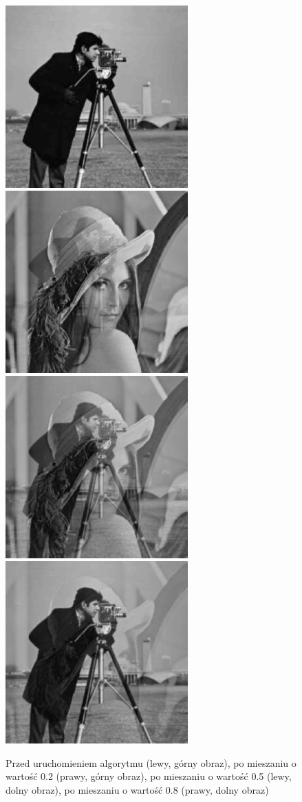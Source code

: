 \documentclass[a4paper,12pt]{book}
\begin{document}
\begin{figure}[H]
	\caption{Przed uruchomieniem algorytmu (lewy, górny obraz), po mieszaniu o wartość 0.2 (prawy, górny obraz), po mieszaniu o wartość 0.5 (lewy, dolny obraz), po mieszaniu o wartość 0.8 (prawy, dolny obraz)}
	\includegraphics[width=7cm, height=7cm]{man-unmodified.jpg}
	\includegraphics[width=7cm, height=7cm]{2/blend-gray-images-2.png}
	\includegraphics[width=7cm, height=7cm]{2/blend-gray-images-5.png}
	\includegraphics[width=7cm, height=7cm]{2/blend-gray-images-8.png}
\end{figure}
\end{document}
